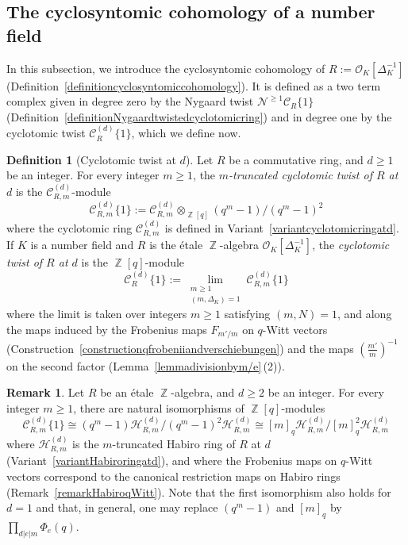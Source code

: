 \documentclass[10pt,twoside]{scrarticle}
\newlength{\mar} \setlength{\mar}{1cm}%
\newlength{\len}
\theoremstyle{definition}
\newtheorem{remark}[theorem]{Remark}
\newtheorem{definition}[theorem]{Definition}
\DeclareMathOperator{\Z}{\mathbb{Z}}
\newcommand{\nbrrg}{\mathcal{O}_K[\Delta_K^{-1}]}
\newcommand{\CR}{\mathcal{C}_{R}}
\newcommand{\CRm}{\mathcal{C}_{R,m}}
\renewcommand{\ge}{\geqslant}
\numberwithin{equation}{theorem}
\begin{document}
\subsection{The cyclosyntomic cohomology of a number field}\label{subsectionthecyclosyntomiccohomologyofanumberfield}

In this subsection, we introduce the cyclosyntomic cohomology of $R:=\mathcal{O}_K[\Delta_K^{-1}]$ (Definition~\ref{definitioncyclosyntomiccohomology}). It is defined as a two term complex given in degree zero by the Nygaard twist $\mathcal{N}^{\ge 1} \CR\{1\}$ (Definition~\ref{definitionNygaardtwistedcyclotomicring}) and in degree one by the cyclotomic twist $\CR^{(d)}\{1\}$, which we define now.

\begin{definition}[Cyclotomic twist at $d$]\label{definitiontwistedcyclotomicringatd}
    Let $R$ be a commutative ring, and $d \ge 1$ be an integer. For every integer $m \ge 1$, the \emph{$m$-truncated cyclotomic twist of $R$ at $d$} is the $\CRm^{(d)}$-module
    $$\CRm^{(d)}\{1\} := \CRm^{(d)} \otimes_{\Z[q]} (q^m-1)/(q^m-1)^2$$
    where the cyclotomic ring $\CRm^{(d)}$ is defined in Variant~\ref{variantcyclotomicringatd}. If $K$ is a number field and $R$ is the étale $\Z$-algebra $\nbrrg$, the \emph{cyclotomic twist of $R$ at $d$} is the $\Z[q]$-module
    $$\CR^{(d)}\{1\} := \lim_{\substack{m \ge 1 \\ (m,\Delta_K)=1}} \CRm^{(d)}\{1\}$$
    where the limit is taken over integers $m \ge 1$ satisfying $(m,N)=1$, and along the maps induced by the Frobenius maps $F_{m'/m}$ on $q$-Witt vectors (Construction~\ref{constructionqfrobeniiandverschiebungen}) and the maps $(\frac{m'}{m})^{-1}$ on the second factor (Lemma~\ref{lemmadivisionbym/e}\,(2)).
\end{definition}

\begin{remark}\label{remarklimitovermNygaardandtwistedcyclotomic}
    Let $R$ be an étale $\Z$-algebra, and $d \ge 2$ be an integer. For every integer $m \ge 1$, there are natural isomorphisms of $\Z[q]$-modules
    $$\CRm^{(d)}\{1\} \cong (q^m-1) \mathcal{H}^{(d)}_{R,m} / (q^m-1)^2\mathcal{H}^{(d)}_{R,m} \cong [m]_q\mathcal{H}^{(d)}_{R,m} / [m]_q^2\mathcal{H}^{(d)}_{R,m}$$
    where $\mathcal{H}_{R,m}^{(d)}$ is the $m$-truncated Habiro ring of $R$ at $d$ (Variant~\ref{variantHabiroringatd}), and where the Frobenius maps on $q$-Witt vectors correspond to the canonical restriction maps on Habiro rings (Remark~\ref{remarkHabiroqWitt}). Note that the first isomorphism also holds for $d=1$ and that, in general, one may replace $(q^m-1)$ and $[m]_q$ by $\prod_{d|e|m}\Phi_e(q)$.
\end{remark}
\end{document}
